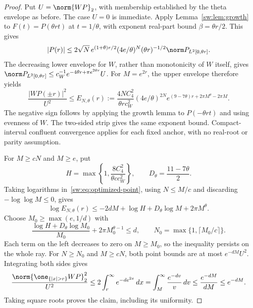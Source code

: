 \documentclass[11pt,a4paper]{article}
\numberwithin{equation}{section}
\theoremstyle{definition}\newtheorem{definition}[theorem]{Definition}
\theoremstyle{remark}\newtheorem{remark}[theorem]{Remark}
\begin{document}
\begin{proof}
Put $U=\norm{WP}_2$, with membership established by the theta envelope as before. The case $U=0$ is immediate. Apply Lemma~\ref{sw:lem:growth} to $F(t)=P(\theta rt)$ at $t=1/\theta$, with exponent real-part bound $\beta=\theta r/2$. This gives
\[
 |P(r)|\le2\sqrt N\,e^{(1+\theta)r/2}(4e/\theta)^N
          (\theta r)^{-1/2}\norm P_{L^2[0,\theta r]}.
\]
The decreasing lower envelope for $W$, rather than monotonicity of $W$ itself, gives
$\norm P_{L^2[0,\theta r]}\le c_W^{-1}e^{-4\theta r+\pi e^{2\theta r}}U$.
For $M=e^{2r}$, the upper envelope therefore yields
\begin{equation}\label{sw:eq:optimized-point}
 \frac{|WP(\pm r)|^2}{U^2}\le
 E_{N,\theta}(r):=
 \frac{4NC_4^2}{\theta r c_W^2}(4e/\theta)^{2N}
 e^{(9-7\theta)r+2\pi M^\theta-2\pi M}.
\end{equation}
The negative sign follows by applying the growth lemma to $P(-\theta rt)$ and using evenness of $W$. The two-sided strip gives the same exponent bound. Compact-interval confluent convergence applies for each fixed anchor, with no real-root or parity assumption.

For $M\ge cN$ and $M\ge e$, put
\[
 H=\max\left\{1,\frac{8C_4^2}{\theta c c_W^2}\right\},
 \qquad D_\theta=\frac{11-7\theta}{2}.
\]
Taking logarithms in~\eqref{sw:eq:optimized-point}, using $N\le M/c$ and discarding $-\log\log M\le0$, gives
\[
 \log E_{N,\theta}(r)
 \le-2dM+\log H+D_\theta\log M+2\pi M^\theta.
\]
Choose $M_0\ge\max(e,1/d)$ with
\begin{equation}\label{sw:eq:optimized-threshold}
 \frac{\log H+D_\theta\log M_0}{M_0}
                  +2\pi M_0^{\theta-1}\le d,
 \qquad N_0=\max\{1,\lceil M_0/c\rceil\}.
\end{equation}
Each term on the left decreases to zero on $M\ge M_0$, so the inequality persists on the whole ray. For $N\ge N_0$ and $M\ge cN$, both point bounds are at most $e^{-dM}U^2$. Integrating both sides gives
\[
 \frac{\norm{\one_{\{|x|>r\}}WP}_2^2}{U^2}
 \le2\int_r^\infty e^{-de^{2x}}\,dx
 =\int_M^\infty\frac{e^{-dv}}v\,dv
 \le\frac{e^{-dM}}{dM}\le e^{-dM}.
\]
Taking square roots proves the claim, including its uniformity.
\end{proof}
\end{document}
